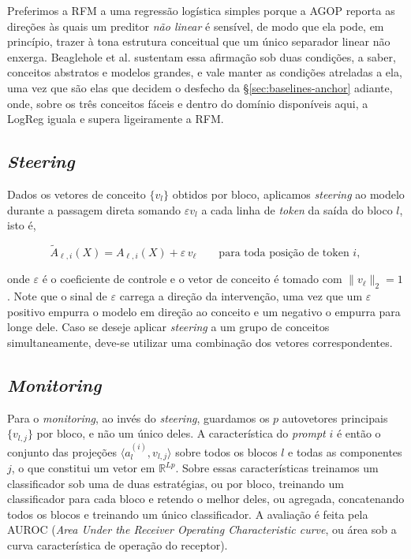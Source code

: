 Preferimos a RFM a uma regressão logística simples porque a AGOP reporta as direções às
quais um preditor \emph{não linear} é sensível, de modo que ela pode, em princípio, trazer
à tona estrutura conceitual que um único separador linear não enxerga. Beaglehole et al.
sustentam essa afirmação sob duas condições, a saber, conceitos abstratos e modelos
grandes, e vale manter as condições atreladas a ela, uma vez que são elas que decidem o
desfecho da §\ref{sec:baselines-anchor} adiante, onde, sobre os três conceitos fáceis e
dentro do domínio disponíveis aqui, a LogReg iguala e supera ligeiramente a
RFM.

\subsection{\textit{Steering}}

Dados os vetores de conceito $\{v_l\}$ obtidos por bloco, aplicamos \textit{steering} ao
modelo durante a passagem direta somando $\varepsilon v_l$ a cada linha de \textit{token} da saída do bloco
$l$, isto é,

\[
  \tilde{A}_{\ell,i}(X) = A_{\ell,i}(X) + \varepsilon\, v_\ell
  \qquad \text{para toda posição de token } i,
\]

onde $\varepsilon$ é o coeficiente de controle e o vetor de conceito é tomado com
$\|v_\ell\|_2 = 1$. Note que o sinal de $\varepsilon$ carrega a direção da intervenção,
uma vez que um $\varepsilon$ positivo empurra o modelo em direção ao conceito e um negativo
o empurra para longe dele. Caso se deseje aplicar \textit{steering} a um grupo de conceitos
simultaneamente, deve-se utilizar uma combinação dos vetores correspondentes.

\subsection{\textit{Monitoring}}

Para o \textit{monitoring}, ao invés do \textit{steering}, guardamos os $p$ autovetores principais
$\{v_{l,j}\}$ por bloco, e não um único deles. A característica do \textit{prompt} $i$ é
então o conjunto das projeções $\langle a_l^{(i)}, v_{l,j} \rangle$ sobre todos os blocos
$l$ e todas as componentes $j$, o que constitui um vetor em $\mathbb{R}^{Lp}$. Sobre essas
características treinamos um classificador sob uma de duas estratégias, ou por bloco,
treinando um classificador para cada bloco e retendo o melhor deles, ou agregada,
concatenando todos os blocos e treinando um único classificador. A avaliação é feita pela
AUROC (\textit{Area Under the Receiver Operating Characteristic curve}, ou área sob a
curva característica de operação do receptor).

